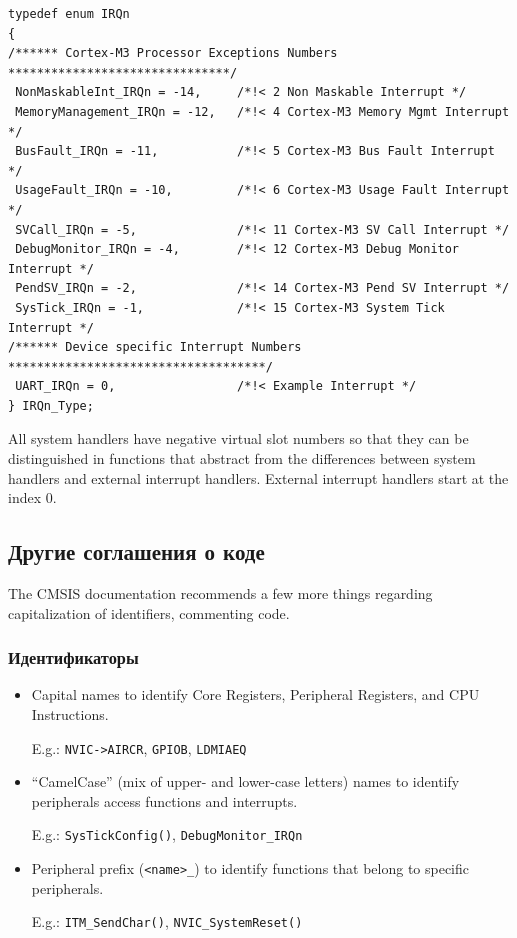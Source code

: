 \begin{lstlisting}[style=cpp,title=Listing shows the generic part of the
(\file{<device>.h}) file.] typedef enum IRQn
{
/****** Cortex-M3 Processor Exceptions Numbers *******************************/
 NonMaskableInt_IRQn = -14, 	/*!< 2 Non Maskable Interrupt */
 MemoryManagement_IRQn = -12, 	/*!< 4 Cortex-M3 Memory Mgmt Interrupt */
 BusFault_IRQn = -11, 			/*!< 5 Cortex-M3 Bus Fault Interrupt */
 UsageFault_IRQn = -10, 		/*!< 6 Cortex-M3 Usage Fault Interrupt */
 SVCall_IRQn = -5, 				/*!< 11 Cortex-M3 SV Call Interrupt */
 DebugMonitor_IRQn = -4, 		/*!< 12 Cortex-M3 Debug Monitor Interrupt */
 PendSV_IRQn = -2, 				/*!< 14 Cortex-M3 Pend SV Interrupt */
 SysTick_IRQn = -1, 			/*!< 15 Cortex-M3 System Tick Interrupt */
/****** Device specific Interrupt Numbers ************************************/
 UART_IRQn = 0, 				/*!< Example Interrupt */
} IRQn_Type;
\end{lstlisting}

All system handlers have negative virtual slot numbers so that they can be
distinguished in functions that abstract from the differences between system
handlers and external interrupt handlers. External interrupt handlers start at
the index 0.

\subsection{Другие соглашения о коде}

The CMSIS documentation recommends a few more things regarding capitalization of
identifiers, commenting code.

\subsubsection{Идентификаторы}

\begin{itemize}
  \item Capital names to identify Core Registers, Peripheral Registers, and CPU
  Instructions.
  
  E.g.: \verb|NVIC->AIRCR|, \verb|GPIOB|, \verb|LDMIAEQ|
  
  \item “CamelCase” (mix of upper- and lower-case letters) names to identify
  peripherals access functions and interrupts.

 E.g.: \verb|SysTickConfig()|, \verb|DebugMonitor_IRQn|

  \item Peripheral prefix (\verb|<name>_|) to identify functions that belong to
  specific peripherals.

 E.g.: \verb|ITM_SendChar()|, \verb|NVIC_SystemReset()|

\end{itemize}

